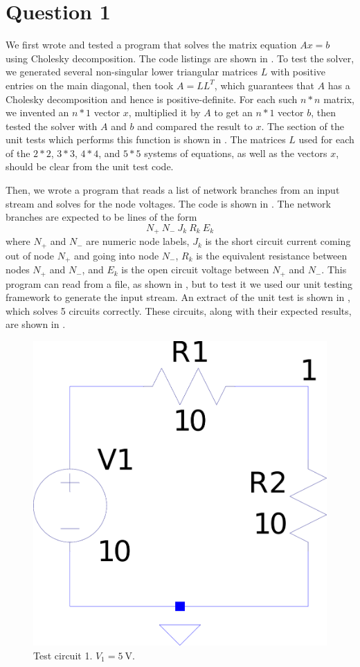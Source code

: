 \documentclass[journal,hidelinks]{IEEEtran}
\begin{document}
\section*{Question 1}

We first wrote and tested a program that solves the matrix equation $A x = b$ using Cholesky decomposition. The code listings are shown in . To test the solver, we generated several non-singular lower triangular matrices $L$ with positive entries on the main diagonal, then took $A = L L^T$, which guarantees that $A$ has a Cholesky decomposition and hence is positive-definite. For each such $n * n$ matrix, we invented an $n * 1$ vector $x$, multiplied it by $A$ to get an $n * 1$ vector $b$, then tested the solver with $A$ and $b$ and compared the result to $x$. The section of the unit tests which performs this function is shown in . The matrices $L$ used for each of the $2 * 2$, $3 * 3$, $4 * 4$, and $5 * 5$ systems of equations, as well as the vectors $x$, should be clear from the unit test code.

Then, we wrote a program that reads a list of network branches from an input stream and solves for the node voltages. The code is shown in . The network branches are expected to be lines of the form
\[ N_+ \  N_- \  J_k \  R_k \  E_k \]
where $N_+$ and $N_-$ are numeric node labels, $J_k$ is the short circuit current coming out of node $N_+$ and going into node $N_-$, $R_k$ is the equivalent resistance between nodes $N_+$ and $N_-$, and $E_k$ is the open circuit voltage between $N_+$ and $N_-$. This program can read from a file, as shown in , but to test it we used our unit testing framework to generate the input stream. An extract of the unit test is shown in , which solves 5 circuits correctly. These circuits, along with their expected results, are shown in .

\begin{figure}[!htb]
  \centering
  \includegraphics[width=\columnwidth,height=0.4\columnwidth,keepaspectratio]{question-1/circuit-1.pdf}
  \caption{Test circuit 1. $V_1 = \SI{5}{\volt}$.}
  \label{fig:q1-circuit-1}
\end{figure}
\end{document}
